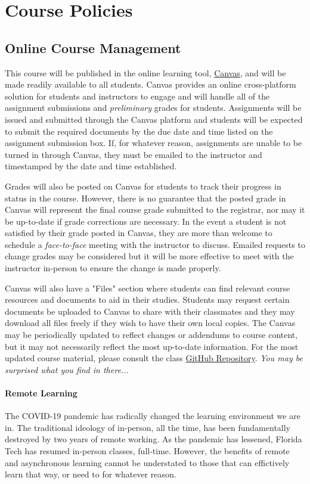 \section*{Course Policies} 
    \subsection*{Online Course Management}
    This course will be published in the online learning tool, \href{https://fit.instructure.com/}{Canvas}, and will be made readily available to all students. 
    Canvas provides an online cross-platform solution for students and instructors to engage and will handle all of the assignment submissions and \emph{preliminary} grades for students.
    Assignments will be issued and submitted through the Canvas platform and students will be expected to submit the required documents by the due date and time listed on the assignment submission box.
    If, for whatever reason, assignments are unable to be turned in through Canvas, they must be emailed to the instructor and timestamped by the date and time established.
    
    Grades will also be posted on Canvas for students to track their progress in status in the course.
    However, there is no guarantee that the posted grade in Canvas will represent the final course grade submitted to the registrar, nor may it be up-to-date if grade corrections are necessary.
    In the event a student is not satisfied by their grade posted in Canvas, they are more than welcome to schedule a \emph{face-to-face} meeting with the instructor to discuss.
    Emailed requests to change grades may be considered but it will be more effective to meet with the instructor in-person to ensure the change is made properly.

    Canvas will also have a "Files" section where students can find relevant course resources and documents to aid in their studies.
    Students may request certain documents be uploaded to Canvas to share with their classmates and they may download all files freely if they wish to have their own local copies.
    The Canvas may be periodically updated to reflect changes or addendums to course content, but it may not necessarily reflect the most up-to-date information.
    For the most updated course material, please consult the class \href{https://github.com/Legohead259/OCE4531-Materials}{GitHub Repository}. \emph{You may be surprised what you find in there...}

    \paragraph*{Remote Learning} The COVID-19 pandemic has radically changed the learning environment we are in.
    The traditional ideology of in-person, all the time, has been fundamentally destroyed by two years of remote working.
    As the pandemic has lessened, Florida Tech has resumed in-person classes, full-time.
    However, the benefits of remote and asynchronous learning cannot be understated to those that can effictively learn that way, or need to for whatever reason.

